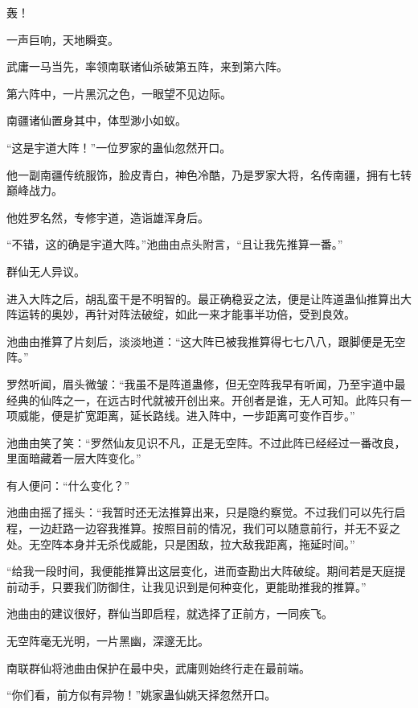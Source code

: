 
\begin{this_body}

轰！

一声巨响，天地瞬变。

武庸一马当先，率领南联诸仙杀破第五阵，来到第六阵。

第六阵中，一片黑沉之色，一眼望不见边际。

南疆诸仙置身其中，体型渺小如蚁。

“这是宇道大阵！”一位罗家的蛊仙忽然开口。

他一副南疆传统服饰，脸皮青白，神色冷酷，乃是罗家大将，名传南疆，拥有七转巅峰战力。

他姓罗名然，专修宇道，造诣雄浑身后。

“不错，这的确是宇道大阵。”池曲由点头附言，“且让我先推算一番。”

群仙无人异议。

进入大阵之后，胡乱蛮干是不明智的。最正确稳妥之法，便是让阵道蛊仙推算出大阵运转的奥妙，再针对阵法破绽，如此一来才能事半功倍，受到良效。

池曲由推算了片刻后，淡淡地道：“这大阵已被我推算得七七八八，跟脚便是无空阵。”

罗然听闻，眉头微皱：“我虽不是阵道蛊修，但无空阵我早有听闻，乃至宇道中最经典的仙阵之一，在远古时代就被开创出来。开创者是谁，无人可知。此阵只有一项威能，便是扩宽距离，延长路线。进入阵中，一步距离可变作百步。”

池曲由笑了笑：“罗然仙友见识不凡，正是无空阵。不过此阵已经经过一番改良，里面暗藏着一层大阵变化。”

有人便问：“什么变化？”

池曲由摇了摇头：“我暂时还无法推算出来，只是隐约察觉。不过我们可以先行启程，一边赶路一边容我推算。按照目前的情况，我们可以随意前行，并无不妥之处。无空阵本身并无杀伐威能，只是困敌，拉大敌我距离，拖延时间。”

“给我一段时间，我便能推算出这层变化，进而查勘出大阵破绽。期间若是天庭提前动手，只要我们防御住，让我见识到是何种变化，更能助推我的推算。”

池曲由的建议很好，群仙当即启程，就选择了正前方，一同疾飞。

无空阵毫无光明，一片黑幽，深邃无比。

南联群仙将池曲由保护在最中央，武庸则始终行走在最前端。

“你们看，前方似有异物！”姚家蛊仙姚天择忽然开口。


\end{this_body}
